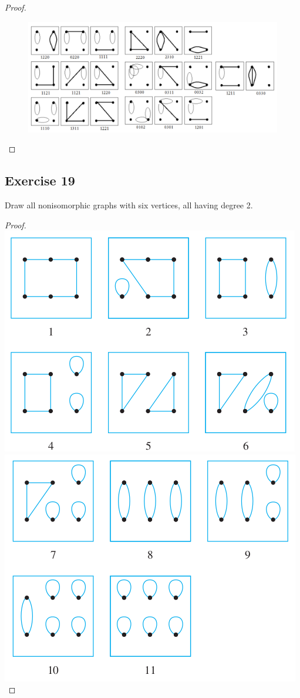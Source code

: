 \documentclass[14pt]{extarticle}
\begin{document}
\begin{proof}
\begin{figure}[ht!]
\centering
\includegraphics[scale=0.45]{../images/10.3.18.png}
\end{figure}
\end{proof}

\subsection{Exercise 19}
Draw all nonisomorphic graphs with six vertices, all having degree 2.

\begin{proof}
\includegraphics[scale=0.4]{../images/10.3.19.a.png}
\includegraphics[scale=0.4]{../images/10.3.19.b.png}
\end{proof}
\end{document}
